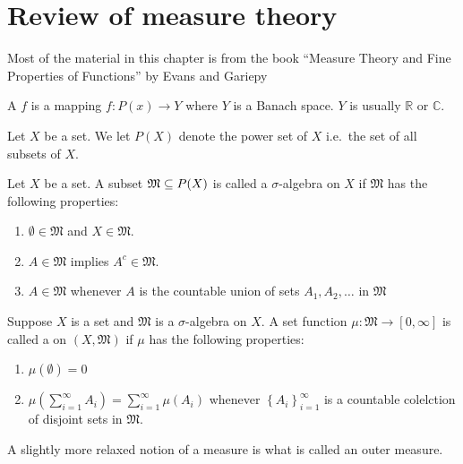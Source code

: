 \chapter{Review of measure theory}

Most of the material in this chapter is from the book ``Measure Theory
and Fine Properties of Functions'' by Evans and Gariepy
\cite{evans1991measure}

\begin{defn}
  A  $f$ is a mapping $f:P(x) \to Y$ where $Y$ is a
  Banach space. $Y$ is usually $\mathbb{R}$ or $\mathbb{C}$.
\end{defn}

\begin{defn}
  Let $X$ be a set. We let $P(X)$ denote the power set of $X$ i.e.\ the
  set of all subsets of $X$.
\end{defn}

\begin{defn}
  Let $X$ be a set. A subset $\mathfrak{M}\subseteq P(X)$ is called a
  $\sigma$-algebra on $X$ if $\mathfrak{M}$ has the following properties:
  \begin{enumerate}
    \item $\emptyset \in \mathfrak{M}$ and $X\in \mathfrak{M}$.
    \item $A\in \mathfrak{M}$ implies $A^c\in \mathfrak{M}$.
    \item $A\in \mathfrak{M}$ whenever $A$ is the countable union of
      sets $A_1,A_2,\ldots$ in $\mathfrak{M}$
  \end{enumerate}
\end{defn}

\begin{defn}
  Suppose $X$ is a set and $\mathfrak{M}$ is a $\sigma$-algebra on
  $X$. A set function $\mu: \mathfrak{M} \to [0,\infty]$ is called a
   on $(X, \mathfrak{M})$ if $\mu$ has the following
  properties:
  \begin{enumerate}
    \item $\mu(\emptyset)=0$
    \item $\mu\left( \sum_{i=1}^\infty A_i \right) =
      \sum_{i=1}^\infty\mu(A_i)$ whenever $\left\{ A_i
      \right\}_{i=1}^\infty$ is a countable colelction of disjoint sets
      in $ \mathfrak{M}$.
  \end{enumerate}
\end{defn}

A slightly more relaxed notion of a measure is what is called an outer measure.

